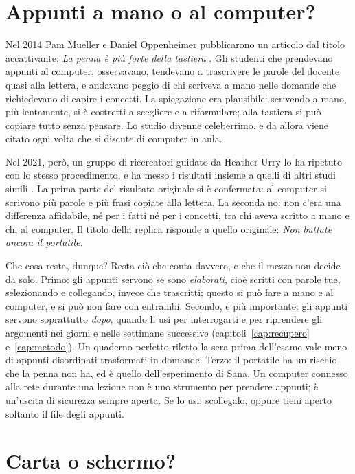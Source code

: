 \section{Appunti a mano o al computer?}

Nel 2014 Pam Mueller e Daniel Oppenheimer pubblicarono un articolo dal
titolo accattivante: \emph{La penna è più forte della tastiera}
\parencite{mueller2014}. Gli studenti che prendevano appunti al
computer, osservavano, tendevano a trascrivere le parole del docente
quasi alla lettera, e andavano peggio di chi scriveva a mano nelle
domande che richiedevano di capire i concetti. La spiegazione era
plausibile: scrivendo a mano, più lentamente, si è costretti a
scegliere e a riformulare; alla tastiera si può copiare tutto senza
pensare. Lo studio divenne celeberrimo, e da allora viene citato ogni
volta che si discute di computer in aula.

Nel 2021, però, un gruppo di ricercatori guidato da Heather Urry lo ha
ripetuto con lo stesso procedimento, e ha messo i risultati insieme a
quelli di altri studi simili \parencite{urry2021}. La prima parte del
risultato originale si è confermata: al computer si scrivono più parole
e più frasi copiate alla lettera. La seconda no: non c'era una
differenza affidabile, né per i fatti né per i concetti, tra chi aveva
scritto a mano e chi al computer. Il titolo della replica risponde a
quello originale: \emph{Non buttate ancora il portatile}.

Che cosa resta, dunque? Resta ciò che conta davvero, e che il mezzo non
decide da solo. Primo: gli appunti servono se sono \emph{elaborati},
cioè scritti con parole tue, selezionando e collegando, invece che
trascritti; questo si può fare a mano e al computer, e si può non fare
con entrambi. Secondo, e più importante: gli appunti servono
soprattutto \emph{dopo}, quando li usi per interrogarti e per
riprendere gli argomenti nei giorni e nelle settimane successive
(capitoli~\ref{cap:recupero} e~\ref{cap:metodo}). Un quaderno perfetto
riletto la sera prima dell'esame vale meno di appunti disordinati
trasformati in domande. Terzo: il portatile ha un rischio che la penna
non ha, ed è quello dell'esperimento di Sana. Un computer connesso alla
rete durante una lezione non è uno strumento per prendere appunti; è
un'uscita di sicurezza sempre aperta. Se lo usi, scollegalo, oppure
tieni aperto soltanto il file degli appunti.

\section{Carta o schermo?}

